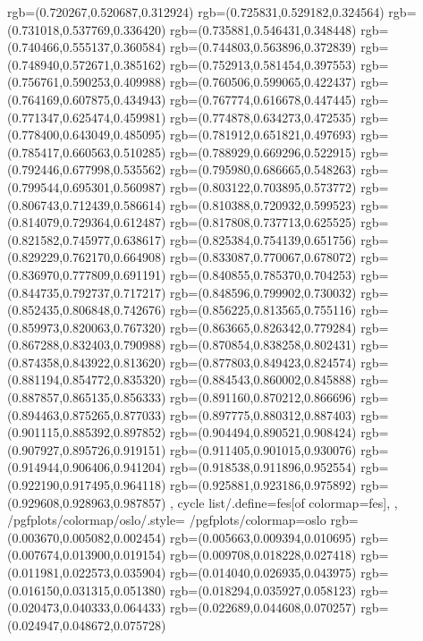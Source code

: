 {{{			rgb=(0.720267,0.520687,0.312924)
			rgb=(0.725831,0.529182,0.324564)
			rgb=(0.731018,0.537769,0.336420)
			rgb=(0.735881,0.546431,0.348448)
			rgb=(0.740466,0.555137,0.360584)
			rgb=(0.744803,0.563896,0.372839)
			rgb=(0.748940,0.572671,0.385162)
			rgb=(0.752913,0.581454,0.397553)
			rgb=(0.756761,0.590253,0.409988)
			rgb=(0.760506,0.599065,0.422437)
			rgb=(0.764169,0.607875,0.434943)
			rgb=(0.767774,0.616678,0.447445)
			rgb=(0.771347,0.625474,0.459981)
			rgb=(0.774878,0.634273,0.472535)
			rgb=(0.778400,0.643049,0.485095)
			rgb=(0.781912,0.651821,0.497693)
			rgb=(0.785417,0.660563,0.510285)
			rgb=(0.788929,0.669296,0.522915)
			rgb=(0.792446,0.677998,0.535562)
			rgb=(0.795980,0.686665,0.548263)
			rgb=(0.799544,0.695301,0.560987)
			rgb=(0.803122,0.703895,0.573772)
			rgb=(0.806743,0.712439,0.586614)
			rgb=(0.810388,0.720932,0.599523)
			rgb=(0.814079,0.729364,0.612487)
			rgb=(0.817808,0.737713,0.625525)
			rgb=(0.821582,0.745977,0.638617)
			rgb=(0.825384,0.754139,0.651756)
			rgb=(0.829229,0.762170,0.664908)
			rgb=(0.833087,0.770067,0.678072)
			rgb=(0.836970,0.777809,0.691191)
			rgb=(0.840855,0.785370,0.704253)
			rgb=(0.844735,0.792737,0.717217)
			rgb=(0.848596,0.799902,0.730032)
			rgb=(0.852435,0.806848,0.742676)
			rgb=(0.856225,0.813565,0.755116)
			rgb=(0.859973,0.820063,0.767320)
			rgb=(0.863665,0.826342,0.779284)
			rgb=(0.867288,0.832403,0.790988)
			rgb=(0.870854,0.838258,0.802431)
			rgb=(0.874358,0.843922,0.813620)
			rgb=(0.877803,0.849423,0.824574)
			rgb=(0.881194,0.854772,0.835320)
			rgb=(0.884543,0.860002,0.845888)
			rgb=(0.887857,0.865135,0.856333)
			rgb=(0.891160,0.870212,0.866696)
			rgb=(0.894463,0.875265,0.877033)
			rgb=(0.897775,0.880312,0.887403)
			rgb=(0.901115,0.885392,0.897852)
			rgb=(0.904494,0.890521,0.908424)
			rgb=(0.907927,0.895726,0.919151)
			rgb=(0.911405,0.901015,0.930076)
			rgb=(0.914944,0.906406,0.941204)
			rgb=(0.918538,0.911896,0.952554)
			rgb=(0.922190,0.917495,0.964118)
			rgb=(0.925881,0.923186,0.975892)
			rgb=(0.929608,0.928963,0.987857)
		},
	cycle list/.define={fes}{[of colormap=fes]},
	},
	/pgfplots/colormap/oslo/.style={
		/pgfplots/colormap={oslo}{%
			rgb=(0.003670,0.005082,0.002454)
			rgb=(0.005663,0.009394,0.010695)
			rgb=(0.007674,0.013900,0.019154)
			rgb=(0.009708,0.018228,0.027418)
			rgb=(0.011981,0.022573,0.035904)
			rgb=(0.014040,0.026935,0.043975)
			rgb=(0.016150,0.031315,0.051380)
			rgb=(0.018294,0.035927,0.058123)
			rgb=(0.020473,0.040333,0.064433)
			rgb=(0.022689,0.044608,0.070257)
			rgb=(0.024947,0.048672,0.075728)
}}}
